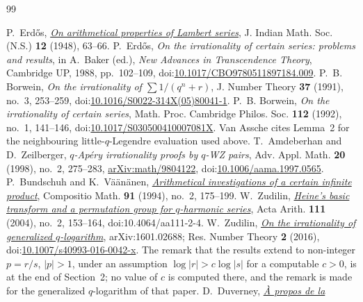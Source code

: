 \begin{thebibliography}{99}
\small
\raggedright
\setlength{\itemsep}{0pt}
 P.~Erd\H{o}s,
  \href{https://users.renyi.hu/~p_erdos/1948-04.pdf}{\emph{On arithmetical
  properties of Lambert series}},
  J. Indian Math. Soc. (N.S.) \textbf{12} (1948), 63--66.
 P.~Erd\H{o}s, \emph{On the irrationality of certain series:
  problems and results}, in A.~Baker (ed.), \emph{New Advances in Transcendence
  Theory}, Cambridge UP, 1988, pp.~102--109,
  doi:\href{https://doi.org/10.1017/CBO9780511897184.009}{10.1017/CBO9780511897184.009}.
 P.~B. Borwein, \emph{On the irrationality of
  $\sum1/(q^{n}+r)$},
  J. Number Theory \textbf{37} (1991), no.~3, 253--259,
  doi:\href{https://doi.org/10.1016/S0022-314X(05)80041-1}{10.1016/S0022-314X(05)80041-1}.
 P.~B. Borwein, \emph{On the irrationality of certain
  series}, Math. Proc. Cambridge Philos. Soc. \textbf{112} (1992), no.~1,
  141--146,
  doi:\href{https://doi.org/10.1017/S030500410007081X}{10.1017/S030500410007081X}.
  Van Assche cites Lemma~2 for the neighbouring little-$q$-Legendre
  evaluation used above.
 T.~Amdeberhan and D.~Zeilberger, \emph{$q$-Ap\'ery
  irrationality proofs by $q$-WZ pairs}, Adv. Appl. Math. \textbf{20} (1998),
  no.~2, 275--283,
  \href{https://arxiv.org/abs/math/9804122}{arXiv:math/9804122},
  doi:\href{https://doi.org/10.1006/aama.1997.0565}{10.1006/aama.1997.0565}.
 P.~Bundschuh and K.~V\"a\"an\"anen,
  \href{https://numdam.org/item/CM_1994__91_2_175_0.pdf}{\emph{Arithmetical
  investigations of a certain infinite product}},
  Compositio Math. \textbf{91} (1994), no.~2, 175--199.
 W.~Zudilin,
  \href{https://geodesic.mathdoc.fr/articles/10.4064/aa111-2-4/}{\emph{Heine's
  basic transform and a permutation group for \(q\)-harmonic series}},
  Acta Arith. \textbf{111} (2004), no.~2, 153--164,
  doi:10.4064/aa111-2-4.
 W.~Zudilin,
  \href{https://arxiv.org/abs/1601.02688}{\emph{On the irrationality of
  generalized \(q\)-logarithm}}, arXiv:1601.02688; Res. Number Theory
  \textbf{2} (2016),
  doi:\href{https://doi.org/10.1007/s40993-016-0042-x}{10.1007/s40993-016-0042-x}.
  The remark that the results extend to non-integer \(p=r/s\), \(|p|>1\), under
  an assumption \(\log|r|>c\log|s|\) for a computable \(c>0\), is at the end of
  Section~2; no value of \(c\) is computed there, and the remark is made for the
  generalized \(q\)-logarithm of that paper.
 D.~Duverney,
  \href{https://numdam.org/item/JTNB_1996__8_1_173_0.pdf}{\emph{\`A propos de la
}}
\end{thebibliography}
